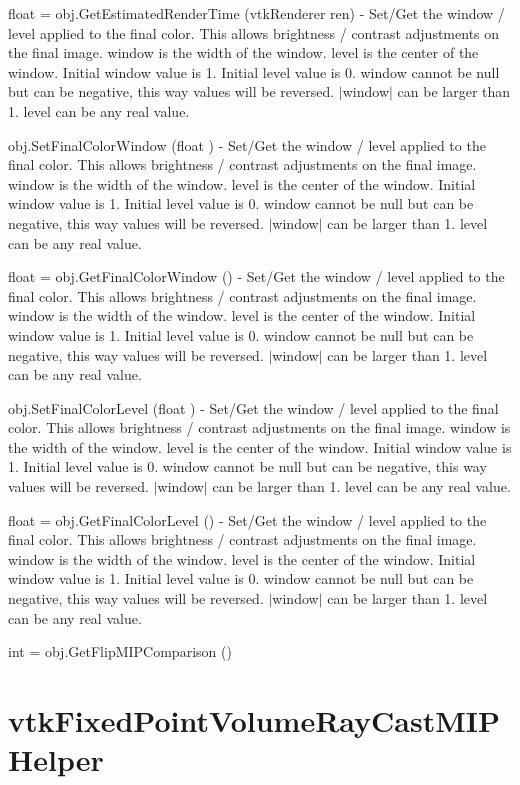 \begin{DoxyItemize}
\item {\ttfamily float = obj.\-Get\-Estimated\-Render\-Time (vtk\-Renderer ren)} -\/ Set/\-Get the window / level applied to the final color. This allows brightness / contrast adjustments on the final image. window is the width of the window. level is the center of the window. Initial window value is 1. Initial level value is 0. window cannot be null but can be negative, this way values will be reversed. $|$window$|$ can be larger than 1. level can be any real value.  
\item {\ttfamily obj.\-Set\-Final\-Color\-Window (float )} -\/ Set/\-Get the window / level applied to the final color. This allows brightness / contrast adjustments on the final image. window is the width of the window. level is the center of the window. Initial window value is 1. Initial level value is 0. window cannot be null but can be negative, this way values will be reversed. $|$window$|$ can be larger than 1. level can be any real value.  
\item {\ttfamily float = obj.\-Get\-Final\-Color\-Window ()} -\/ Set/\-Get the window / level applied to the final color. This allows brightness / contrast adjustments on the final image. window is the width of the window. level is the center of the window. Initial window value is 1. Initial level value is 0. window cannot be null but can be negative, this way values will be reversed. $|$window$|$ can be larger than 1. level can be any real value.  
\item {\ttfamily obj.\-Set\-Final\-Color\-Level (float )} -\/ Set/\-Get the window / level applied to the final color. This allows brightness / contrast adjustments on the final image. window is the width of the window. level is the center of the window. Initial window value is 1. Initial level value is 0. window cannot be null but can be negative, this way values will be reversed. $|$window$|$ can be larger than 1. level can be any real value.  
\item {\ttfamily float = obj.\-Get\-Final\-Color\-Level ()} -\/ Set/\-Get the window / level applied to the final color. This allows brightness / contrast adjustments on the final image. window is the width of the window. level is the center of the window. Initial window value is 1. Initial level value is 0. window cannot be null but can be negative, this way values will be reversed. $|$window$|$ can be larger than 1. level can be any real value.  
\item {\ttfamily int = obj.\-Get\-Flip\-M\-I\-P\-Comparison ()}  
\end{DoxyItemize}\hypertarget{vtkvolumerendering_vtkfixedpointvolumeraycastmiphelper}{}\section{vtk\-Fixed\-Point\-Volume\-Ray\-Cast\-M\-I\-P\-Helper}\label{vtkvolumerendering_vtkfixedpointvolumeraycastmiphelper}
